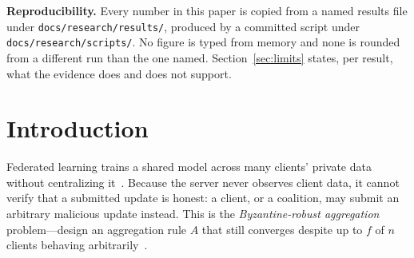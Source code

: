 \documentclass[11pt,a4paper]{article}
\newcommand{\code}[1]{\texttt{\small #1}}
\begin{document}
\begin{abstract}
We then propose, build, ablate, and stress-test \textbf{Deviation
Stability Scoring (DSS)}, a cross-round wrapper that scores clients by
the temporal variance of their deviation trace and the pairwise
correlation between traces. We report it as measured rather than as
hoped. DSS works as designed against temporally unstable colluders
($161.3 \rightarrow 1.18$ mean distance-from-truth wrapping FedAvg);
provides no protection against stable ones, by construction; protects a
genuinely non-IID honest minority only \emph{asymptotically}, with a
measured 6--13 round transient window in which that minority is wrongly
suppressed alongside the real attackers; and---until repaired here---could
make an already-robust base method up to $577\times$ \emph{worse} than
leaving it alone. Our ablation shows the conjunction rule at DSS's core
discards real signal: against non-identical stable colluders a
collusion-only gate scores $1.09$ where the shipped conjunction scores
$17.13$, no better than no defense. We also report a numerical defect
(catastrophic cancellation in \code{f32}) whose repair made results
reproducible but \emph{not} better, disconfirming our own published
diagnosis of the failure it was blamed for. A first real-data check on
MNIST reproduces the central robustness result on a 50{,}890-parameter
model, and finds that Centered Clipping at its commonly-shipped default
radius scores \emph{worse than no defense at all}.
\end{abstract}

\medskip
\noindent\textbf{Reproducibility.} Every number in this paper is copied
from a named results file under \code{docs/research/results/}, produced
by a committed script under \code{docs/research/scripts/}. No figure is
typed from memory and none is rounded from a different run than the one
named. Section~\ref{sec:limits} states, per result, what the evidence
does and does not support.

\tableofcontents
\newpage

\section{Introduction}
\label{sec:intro}

Federated learning trains a shared model across many clients' private
data without centralizing it~\cite{mcmahan2017}. Because the server never
observes client data, it cannot verify that a submitted update is honest:
a client, or a coalition, may submit an arbitrary malicious update
instead. This is the \emph{Byzantine-robust aggregation} problem---design
an aggregation rule $A$ that still converges despite up to $f$ of $n$
clients behaving arbitrarily~\cite{blanchard2017}.
\end{document}
